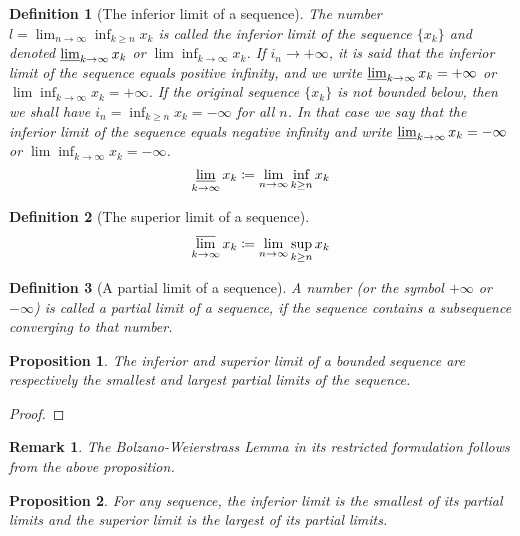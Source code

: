 \documentclass[onecolumn]{ctexart}
\newtheorem{definition}{Definition}
\newtheorem{proposition}{Proposition}
\newtheorem{remark}{Remark}
\begin{document}
\begin{definition}[The inferior limit of a sequence]
  The number $l = \lim_{n \to \infty} \inf_{k \geq n} x_k$ is called the inferior 
  limit of the sequence $\lbrace x_k \rbrace$ and denoted 
  $\varliminf_{k \to \infty} x_k$ or $\lim \inf_{k \to \infty} x_k$. If $i_n \to 
  +\infty$, it is said that the inferior limit of the sequence equals positive 
  infinity, and we write $\varliminf_{k \to \infty} x_k = +\infty$ or $\lim 
  \inf_{k \to \infty} x_k = +\infty$. If the original sequence $\lbrace x_k 
  \rbrace$ is not bounded below, then we shall have $i_n = \inf_{k \geq n} x_k = 
  -\infty$ for all $n$. In that case we say that the inferior limit of the 
  sequence equals negative infinity and write $\varliminf_{k \to \infty} x_k = 
  -\infty$ or $\lim \inf_{k \to \infty} x_k = -\infty$.
  \[
    \varliminf_{k \to \infty} x_k \coloneqq \lim_{n \to \infty} \inf_{k \geq n} x_k
  \]
\end{definition}

\begin{definition}[The superior limit of a sequence]
  \[
    \varlimsup_{k \to \infty} x_k \coloneqq \lim_{n \to \infty} \sup_{k \geq n} x_k
  \]
\end{definition}

\begin{definition}[A partial limit of a sequence]
  A number (or the symbol $+\infty$ or $-\infty$) is called a partial limit of a 
  sequence, if the sequence contains a subsequence converging to that number.
\end{definition}

\begin{proposition}
  The inferior and superior limit of a bounded sequence are respectively the 
  smallest and largest partial limits of the sequence.
\end{proposition}
\begin{proof}
  
\end{proof}

\begin{remark}
  The Bolzano-Weierstrass Lemma in its restricted formulation follows from the 
  above proposition.
\end{remark}

\begin{proposition}
  For any sequence, the inferior limit is the smallest of its partial limits and 
  the superior limit is the largest of its partial limits.
\end{proposition}
\end{document}
